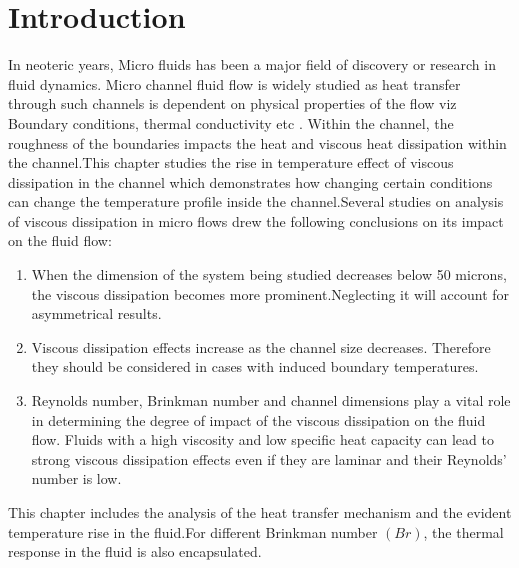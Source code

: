 \documentclass[14pt,one side, a4paper]{extbook}
\begin{document}
	 		\section{Introduction}
	 In neoteric years, Micro fluids has been a major field of discovery or research in fluid dynamics. Micro channel fluid flow is widely studied as heat transfer through such channels is dependent on physical properties of the flow viz Boundary conditions, thermal conductivity etc \cite{rapp}. Within the channel, the roughness of the boundaries impacts the  heat and viscous heat dissipation within the channel\cite{Barletta}.This chapter studies the rise in temperature effect of viscous dissipation in the channel which demonstrates how changing certain conditions can change the temperature profile inside the channel.Several studies on analysis of viscous dissipation in micro flows drew the following conclusions on its impact on the fluid flow:\cite{Gamrat,mokarizadeh,hungyew,Nikuradse}
	 \begin{enumerate}
	 	\item{When the dimension of the system being studied decreases below 50 microns, the viscous dissipation  becomes more prominent.Neglecting it will account for asymmetrical results.}
	    \item {Viscous dissipation effects increase as the channel size decreases. Therefore they should be considered in cases with induced boundary temperatures.}
	    \item{Reynolds number, Brinkman number and channel dimensions play a vital role in determining the degree of impact of the viscous dissipation  on the fluid flow. Fluids with a high viscosity and low specific heat  capacity can lead to strong viscous dissipation effects even if they are laminar and their Reynolds’ number is low.}
	\end{enumerate}
	This chapter includes the analysis of the heat transfer mechanism and the evident temperature rise in the fluid.For different Brinkman number $(Br)$, the thermal response in the fluid is also encapsulated.
\end{document}
